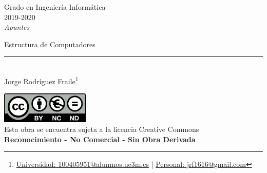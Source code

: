 \documentclass[12pt, twoside, openright]{report} %
\begin{document}
	
\begin{titlepage}
	\begin{sffamily}
	\color{azulUC3M}
	\begin{center}
		\begin{figure}[H] %
		\end{figure}
		\vspace{2.5cm}
		\begin{Large}
			Grado en Ingeniería Informática\\			
			2019-2020\\
			\vspace{2cm}		
			\textsl{Apuntes}\\
			\bigskip
		\end{Large}
		 	{\Huge Estructura de Computadores}\\
		 	\vspace*{0.5cm}
	 		\rule{10.5cm}{0.1mm}\\
			\vspace*{0.9cm}
			{\LARGE Jorge Rodríguez Fraile\footnote{\href{mailto:100405951@alumnos.uc3m.es}{Universidad: 100405951@alumnos.uc3m.es}  |  \href{mailto:jrf1616@gmail.com}{Personal: jrf1616@gmail.com}}}\\ 
			\vspace*{1cm}
	\end{center}
	\vfill
	\color{black}
		\includegraphics[width=4.2cm]{img/creativecommons.png}\\
		Esta obra se encuentra sujeta a la licencia Creative Commons\\ \textbf{Reconocimiento - No Comercial - Sin Obra Derivada}
	\end{sffamily}
\end{titlepage}


\tableofcontents
\thispagestyle{fancy}
\end{document}
